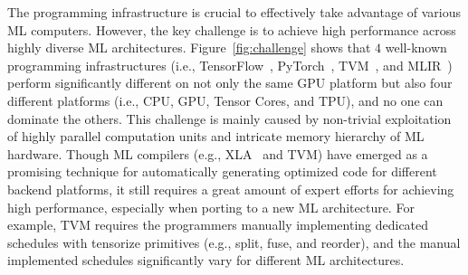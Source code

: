 The programming infrastructure is crucial to effectively take advantage of various ML computers. However, the key challenge is to achieve high performance across highly diverse ML architectures. Figure~\ref{fig:challenge} shows that $4$ well-known programming infrastructures (i.e., TensorFlow~\cite{abadi2016tensorflow}, PyTorch~\cite{paszke2017automatic}, TVM~\cite{chen2018tvm}, and MLIR~\cite{Lattner2020MLIR}) perform significantly different on not only the same GPU platform but also four different platforms (i.e., CPU, GPU, Tensor Cores, and TPU), and no one can dominate the others. This challenge is mainly caused by non-trivial exploitation of highly parallel computation units and intricate memory hierarchy of ML hardware. Though ML compilers (e.g., XLA~\cite{tensorflow2016xla} and TVM) have emerged as a promising technique for automatically generating optimized code for different backend platforms, it still requires a great amount of expert efforts for achieving high performance, especially when porting to a new ML architecture. For example, TVM requires the programmers manually implementing dedicated schedules with tensorize primitives (e.g., split, fuse, and reorder), and the manual implemented schedules significantly vary for different ML architectures. 




